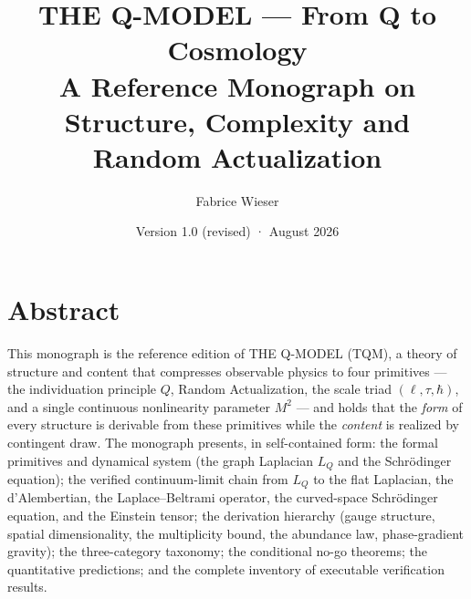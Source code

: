 \documentclass[11pt,twoside]{book}
\title{\bfseries THE Q-MODEL — From Q to Cosmology\\[3mm]
\large A Reference Monograph on Structure, Complexity and Random Actualization}
\author{Fabrice Wieser}
\date{Version 1.0 (revised) \quad·\quad 15 August 2026}
\begin{document}
\frontmatter
\maketitle

\begin{center}
\end{center}

\vspace{3mm}

\chapter*{Abstract}
\noindent
This monograph is the reference edition of THE Q-MODEL (TQM), a theory of structure and
content that compresses observable physics to four primitives — the individuation
principle $Q$, Random Actualization, the scale triad $(\ell,\tau,\hbar)$, and a single
continuous nonlinearity parameter $M^2$ — and holds that the \emph{form} of every structure
is derivable from these primitives while the \emph{content} is realized by contingent draw.
The monograph presents, in self-contained form: the formal primitives and dynamical system
(the graph Laplacian $L_Q$ and the Schr\"odinger equation); the verified continuum-limit
chain from $L_Q$ to the flat Laplacian, the d'Alembertian, the Laplace--Beltrami operator,
the curved-space Schr\"odinger equation, and the Einstein tensor; the derivation hierarchy
(gauge structure, spatial dimensionality, the multiplicity bound, the abundance law,
phase-gradient gravity); the three-category taxonomy; the conditional no-go theorems; the
quantitative predictions; and the complete inventory of executable verification results.
\end{document}
